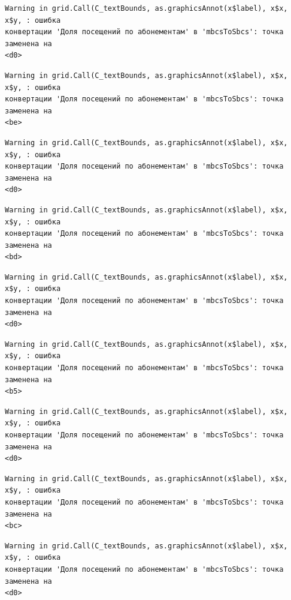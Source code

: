 \documentclass[
  letterpaper,
  DIV=11,
  numbers=noendperiod]{scrreprt}
\begin{document}
\begin{verbatim}
Warning in grid.Call(C_textBounds, as.graphicsAnnot(x$label), x$x, x$y, : ошибка
конвертации 'Доля посещений по абонементам' в 'mbcsToSbcs': точка заменена на
<d0>
\end{verbatim}

\begin{verbatim}
Warning in grid.Call(C_textBounds, as.graphicsAnnot(x$label), x$x, x$y, : ошибка
конвертации 'Доля посещений по абонементам' в 'mbcsToSbcs': точка заменена на
<be>
\end{verbatim}

\begin{verbatim}
Warning in grid.Call(C_textBounds, as.graphicsAnnot(x$label), x$x, x$y, : ошибка
конвертации 'Доля посещений по абонементам' в 'mbcsToSbcs': точка заменена на
<d0>
\end{verbatim}

\begin{verbatim}
Warning in grid.Call(C_textBounds, as.graphicsAnnot(x$label), x$x, x$y, : ошибка
конвертации 'Доля посещений по абонементам' в 'mbcsToSbcs': точка заменена на
<bd>
\end{verbatim}

\begin{verbatim}
Warning in grid.Call(C_textBounds, as.graphicsAnnot(x$label), x$x, x$y, : ошибка
конвертации 'Доля посещений по абонементам' в 'mbcsToSbcs': точка заменена на
<d0>
\end{verbatim}

\begin{verbatim}
Warning in grid.Call(C_textBounds, as.graphicsAnnot(x$label), x$x, x$y, : ошибка
конвертации 'Доля посещений по абонементам' в 'mbcsToSbcs': точка заменена на
<b5>
\end{verbatim}

\begin{verbatim}
Warning in grid.Call(C_textBounds, as.graphicsAnnot(x$label), x$x, x$y, : ошибка
конвертации 'Доля посещений по абонементам' в 'mbcsToSbcs': точка заменена на
<d0>
\end{verbatim}

\begin{verbatim}
Warning in grid.Call(C_textBounds, as.graphicsAnnot(x$label), x$x, x$y, : ошибка
конвертации 'Доля посещений по абонементам' в 'mbcsToSbcs': точка заменена на
<bc>
\end{verbatim}

\begin{verbatim}
Warning in grid.Call(C_textBounds, as.graphicsAnnot(x$label), x$x, x$y, : ошибка
конвертации 'Доля посещений по абонементам' в 'mbcsToSbcs': точка заменена на
<d0>
\end{verbatim}
\end{document}
